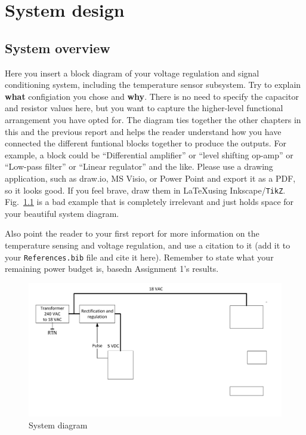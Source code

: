 
\chapter{System design}
\section{System overview} \label{sec:system}
Here you insert a block diagram of your voltage regulation and signal conditioning system, including the temperature sensor subsystem. 
Try to explain \textbf{what} configiation you chose and \textbf{why}. 
There is no need to specify the capacitor and resistor values here, but you want to capture the higher-level functional arrangement you have opted for. The diagram ties together the other chapters in this and the previous report and helps the reader understand how you have connected the different funtional blocks together to produce the outputs. For example, a block could be ``Differential amplifier'' or ``level shifting op-amp'' or ``Low-pass filter'' or ``Linear regulator'' and the like. 
Please use a drawing application, such as draw.io, MS Visio, or Power Point and export it as a PDF, so it looks good. If you feel brave, draw them in \LaTeX using Inkscape/\texttt{TikZ}.
Fig.\ \ref{fig:system_diagram} is a bad example that is completely irrelevant and just holds space for your beautiful system diagram. 

Also point the reader to your first report for more information on the temperature sensing and voltage regulation, and use a citation to it (add it to your \texttt{References.bib} file and cite it here). Remember to state what your remaining power budget is, basedn Assignment 1's results. 
\begin{figure}[!htb]
    \centering
    \includegraphics[width = 0.5\linewidth]{Figures/PowerSystemDiagram.pdf}
    \caption{System diagram}
    \label{fig:system_diagram}
\end{figure}

\vfill









